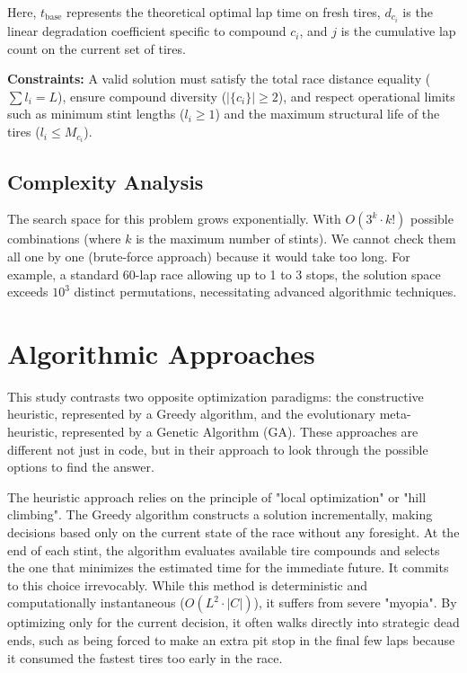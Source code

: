 \documentclass[10pt]{article}
\begin{document}
Here, $t_{\text{base}}$ represents the theoretical optimal lap time on fresh tires, $d_{c_i}$ is the linear degradation coefficient specific to compound $c_i$, and $j$ is the cumulative lap count on the current set of tires.

\textbf{Constraints:}
A valid solution must satisfy the total race distance equality ($\sum l_i = L$), ensure compound diversity ($|\{c_i\}| \geq 2$), and respect operational limits such as minimum stint lengths ($l_i \geq 1$) and the maximum structural life of the tires ($l_i \leq M_{c_i}$).

\subsection{Complexity Analysis}

The search space for this problem grows exponentially. With $O(3^k \cdot k!)$ possible combinations (where $k$ is the maximum number of stints). We cannot check them all one by one (brute-force approach) because it would take too long.
For example, a standard 60-lap race allowing up to 1 to 3 stops, the solution space exceeds $10^3$ distinct permutations, necessitating advanced algorithmic techniques.

\section{Algorithmic Approaches}

This study contrasts two opposite optimization paradigms: the constructive heuristic, represented by a Greedy algorithm, and the evolutionary meta-heuristic, represented by a Genetic Algorithm (GA).
These approaches are different not just in code, but in their approach to look through the possible options to find the answer.

The heuristic approach relies on the principle of "local optimization" or "hill climbing". 
The Greedy algorithm constructs a solution incrementally, making decisions based only on the current state of the race without any foresight.
At the end of each stint, the algorithm evaluates available tire compounds and selects the one that minimizes the estimated time for the immediate future.
It commits to this choice irrevocably.
While this method is deterministic and computationally instantaneous ($O(L^2 \cdot |C|)$), it suffers from severe "myopia".
By optimizing only for the current decision, it often walks directly into strategic dead ends, such as being forced to make an extra pit stop in the final few laps because it consumed the fastest tires too early in the race.
\end{document}
